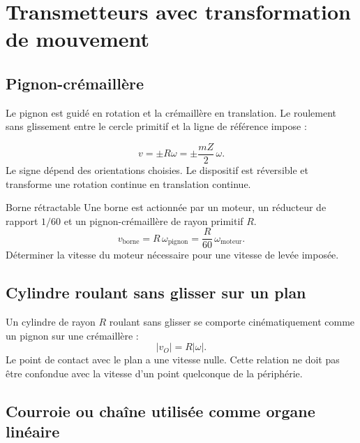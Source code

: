 
\section{Transmetteurs avec transformation de mouvement}
\label{sec:trans-avec}

\subsection{Pignon-crémaillère}

Le pignon est guidé en rotation et la crémaillère en translation. Le
roulement sans glissement entre le cercle primitif et la ligne de
référence impose :

\begin{center}\TLPignonCremaillere\end{center}

\[
\boxed{v=\pm R\omega=\pm\frac{mZ}{2}\,\omega.}
\]
Le signe dépend des orientations choisies. Le dispositif est réversible
et transforme une rotation continue en translation continue.

\begin{TLThreeApp}{Borne rétractable}
Une borne est actionnée par un moteur, un réducteur de rapport $1/60$ et
un pignon-crémaillère de rayon primitif $R$.
\[
v_{\text{borne}}=R\,\omega_{\text{pignon}}
=\frac{R}{60}\,\omega_{\text{moteur}}.
\]
Déterminer la vitesse du moteur nécessaire pour une vitesse de levée
imposée.
\end{TLThreeApp}

\subsection{Cylindre roulant sans glisser sur un plan}

Un cylindre de rayon $R$ roulant sans glisser se comporte
cinématiquement comme un pignon sur une crémaillère :
\[
\boxed{|v_O|=R|\omega|.}
\]
Le point de contact avec le plan a une vitesse nulle. Cette relation ne
doit pas être confondue avec la vitesse d'un point quelconque de la
périphérie.

\subsection{Courroie ou chaîne utilisée comme organe linéaire}

